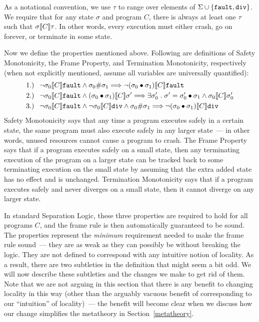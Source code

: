 As a notational convention, we use $\tau$ to range over elements of
$\Sigma \cup \{\fault,\dvg\}$. We require that for any state $\sigma$
and program $C$, there is always at least one $\tau$ such that
$\relate{\den{C}}{\sigma}{\tau}$. In other words, every execution must
either crash, go on forever, or terminate in some state.

Now we define the properties mentioned above. Following are definitions of
Safety Monotonicity, the Frame Property, and Termination Monotonicity, respectively
(when not explicitly mentioned, assume all variables are universally quantified):
\begin{align*}
& \text{1.) }\ \lnot \relate{\den{C}}{\sigma_0}{\fault} \land \sigma_0 \# \sigma_1 \Longrightarrow 
  \lnot \relate{\den{C}}{(\sigma_0 \dt \sigma_1)}{\fault} \\ 
& \text{2.) }\ \lnot \relate{\den{C}}{\sigma_0}{\fault} \land \relate{\den{C}}{(\sigma_0 \dt \sigma_1)}{\sigma'} \Longrightarrow \exists \sigma_0' \such \sigma' = \sigma_0' \dt \sigma_1 \land \relate{\den{C}}{\sigma_0}{\sigma_0'} \\
& \text{3.) }\ \lnot \relate{\den{C}}{\sigma_0}{\fault} \land \lnot \relate{\den{C}}{\sigma_0}{\dvg} 
  \land \sigma_0 \# \sigma_1
\Longrightarrow \lnot \relate{\den{C}}{(\sigma_0 \dt \sigma_1)}{\dvg}\end{align*}
\noindent{}Safety Monotonicity says that any time a program executes safely 
in a certain state, the same program must also execute safely in any larger
state~--- in other words, unused resources cannot cause a program to
crash. The Frame Property says that if a program executes safely on a
small state, then any terminating execution of the program on a larger
state can be tracked back to some terminating execution on the small
state by assuming that the extra added state has no effect and is
unchanged. Termination Monotonicity says that if a
program executes safely and never diverges on a small state, then it
cannot diverge on any larger state.

In standard Separation Logic, these three properties are required to
hold for all programs $C$, and the frame rule is then automatically
guaranteed to be sound. The properties represent 
the \emph{minimum} requirement needed to make the frame rule sound~--- they
are as weak as they can possibly be without breaking the logic. They are
not defined to correspond with any intuitive notion of locality. As a
result, there are two subtleties in the definition that might seem a
bit odd. We will now describe these subtleties and the changes we make
to get rid of them. Note that we are not arguing in this section that
there is any benefit to changing locality in this way (other than the
arguably vacuous benefit of corresponding to our ``intuition'' of
locality)~--- the benefit will become clear when we discuss how our
change simplifies the metatheory in Section~\ref{metatheory}.

